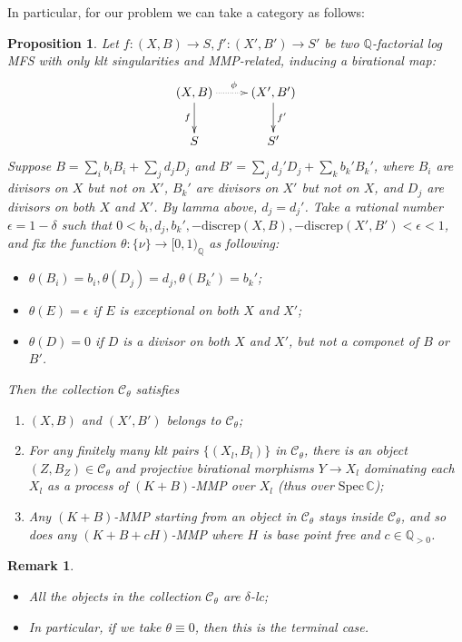 \documentclass{article}
\newtheorem{prop}[defn]{Proposition}
\newtheorem{rmk}[defn]{Remark}
\begin{document}
In particular, for our problem we can take a category as follows:
\begin{prop}\label{cat}
	Let $ f:(X,B)\to S,f':(X',B')\to S' $ be two $ \mathbb{Q} $-factorial log MFS  with only klt singularities and MMP-related, inducing a birational map:
	$$ \xymatrix{
		(X,B)\ar[d]_f\ar@{.>}[r]^\phi&(X',B')\ar[d]^{f'}\\
		S&S'} $$
	Suppose  $ B=\sum_ib_iB_i+\sum_jd_jD_j $ and $ B'=\sum_jd_j'D_j+\sum_kb_k'B_k' $, where $ B_i $ are divisors on $ X $ but not on $ X' $, $ B_k' $ are divisors on $ X' $ but not on $ X $, and $ D_j $ are divisors on both $ X $ and $ X' $. By lamma above, $ d_j=d_j' $. Take a rational number $ \epsilon=1-\delta $ such that $ 0<b_i,d_j,b_k', -\mathrm{discrep}(X,B),-\mathrm{discrep}(X',B')<\epsilon<1 $, and fix the function $ \theta:\{\nu\}\to [0,1)_\mathbb{Q} $ as following:
	\begin{itemize}
		\item $ \theta(B_i)=b_i, \theta(D_j)=d_j,\theta(B_k')=b_k'$;
		\item $ \theta(E)=\epsilon $ if $ E $ is exceptional on both $ X $ and $ X' $;
		\item $ \theta(D)=0 $ if $ D $ is a divisor on both $ X $ and $ X' $, but not a componet of $ B $ or $ B' $.
	\end{itemize}
	Then the collection $ \mathcal{C}_\theta $ satisfies
	\begin{enumerate}[1)]
		\item $ (X,B) $ and $ (X',B') $ belongs to $ \mathcal{C}_\theta $;
		\item For any finitely many klt pairs $ \{(X_l,B_l)\} $ in $ \mathcal{C}_\theta $, there is an object $ (Z,B_Z)\in \mathcal{C}_\theta $ and projective birational morphisms $ Y\to X_l $ dominating each	$ X_l $ as a process of $ (K+B) $-MMP over $ X_l $ (thus over $ \mathrm{Spec}\,\mathbb{C} $);
		\item Any $ (K+B) $-MMP starting from an object in $ \mathcal{C}_\theta $ stays inside $ \mathcal{C}_\theta $, and so does any $ (K+B+cH) $-MMP where $ H $ is base point free and $ c\in \mathbb{Q}_{>0} $. 
	\end{enumerate}
\end{prop}

\begin{rmk}
	\begin{itemize}
		\item All the objects in the collection $ \mathcal{C}_\theta $ are $ \delta $-lc;
		\item In particular, if we take $ \theta\equiv 0 $, then this is the terminal case.
	\end{itemize}	
\end{rmk}
\end{document}
